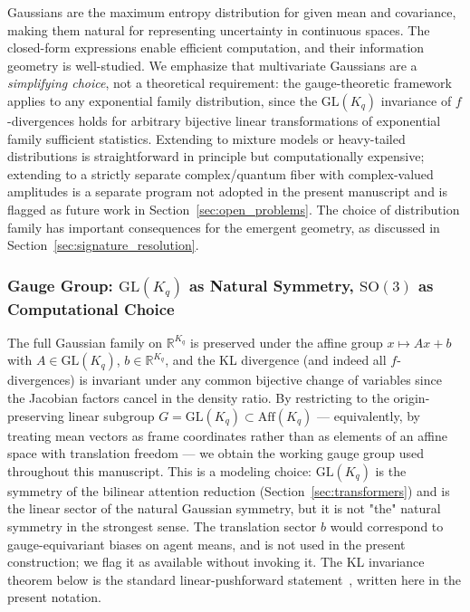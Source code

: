\documentclass[11pt]{article}
\begin{document}
Gaussians are the maximum entropy distribution for given mean and covariance, making them natural for representing uncertainty in continuous spaces. The closed-form expressions enable efficient computation, and their information geometry is well-studied. We emphasize that multivariate Gaussians are a \emph{simplifying choice}, not a theoretical requirement: the gauge-theoretic framework applies to any exponential family distribution, since the $\mathrm{GL}(K_q)$ invariance of $f$-divergences holds for arbitrary bijective linear transformations of exponential family sufficient statistics. Extending to mixture models or heavy-tailed distributions is straightforward in principle but computationally expensive; extending to a strictly separate complex/quantum fiber with complex-valued amplitudes is a separate program not adopted in the present manuscript and is flagged as future work in Section~\ref{sec:open_problems}. The choice of distribution family has important consequences for the emergent geometry, as discussed in Section~\ref{sec:signature_resolution}.

\subsubsection{Gauge Group: $\mathrm{GL}(K_q)$ as Natural Symmetry, $\mathrm{SO}(3)$ as Computational Choice}
\label{sec:gauge_group_choice}

The full Gaussian family on $\mathbb{R}^{K_q}$ is preserved under the affine group $x \mapsto Ax + b$ with $A \in \mathrm{GL}(K_q)$, $b \in \mathbb{R}^{K_q}$, and the KL divergence (and indeed all $f$-divergences) is invariant under any common bijective change of variables since the Jacobian factors cancel in the density ratio. By restricting to the origin-preserving linear subgroup $G = \mathrm{GL}(K_q) \subset \mathrm{Aff}(K_q)$ — equivalently, by treating mean vectors as frame coordinates rather than as elements of an affine space with translation freedom — we obtain the working gauge group used throughout this manuscript. This is a modeling choice: $\mathrm{GL}(K_q)$ is the symmetry of the bilinear attention reduction (Section~\ref{sec:transformers}) and is the linear sector of the natural Gaussian symmetry, but it is not "the" natural symmetry in the strongest sense. The translation sector $b$ would correspond to gauge-equivariant biases on agent means, and is not used in the present construction; we flag it as available without invoking it. The KL invariance theorem below is the standard linear-pushforward statement~\cite{Amari2016}, written here in the present notation.
\end{document}
